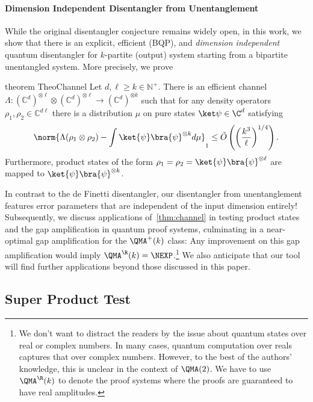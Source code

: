 \paragraph{Dimension Independent Disentangler from Unentanglement}
While the original disentangler conjecture remains widely open, in this work,
we show that there is an explicit, efficient (BQP), and \emph{dimension independent}
quantum disentangler for $k$-partite (output) system starting from a bipartite
unentangled system. More precisely, we prove

\begin{restatable}{theorem}
{TheoChannel}\label{thm:channel}
  Let $d,\ell \ge k \in \mathbb{N}^+$.
  There is an efficient channel $\Lambda \colon (\mathbb{C}^{d})^{\otimes \ell}\otimes (\mathbb{C}^{d})^{\otimes \ell} \to (\mathbb{C}^d)^{\otimes k}$
  such that for any density operators $\rho_1, \rho_2 \in \mathbb{C}^{d\ell}$ there is a distribution $\mu$ on pure states $\ket\psi \in \C^d$ satisfying
  \begin{align*}
    \norm{\Lambda(\rho_1 \otimes \rho_2) - \int \ket{\psi}\bra{\psi}^{\otimes k} d\mu}_1 \le \tilde O\left(\left(\frac{k^3}{\ell}\right)^{1/4}\right).
  \end{align*}
  Furthermore, product states of the form $\rho_1 = \rho_2 = \ket{\psi}\bra{\psi}^{\otimes \ell}$ are
  mapped to $\ket{\psi}\bra{\psi}^{\otimes k}$.
\end{restatable}

In contrast to the de Finetti disentangler, our disentangler from unentanglement features
error parameters that are independent of the input dimension entirely! 
%
Subsequently, we discuss applications of~\cref{thm:channel} in testing product states and
the gap amplification in quantum proof systems, culminating in a near-optimal gap amplification for the $\QMA^+(k)$ class: Any improvement on this gap amplification would imply $\QMA^\R(k)=\NEXP$.\footnote{
We don't want to distract the readers by the issue about quantum states over real or complex numbers.
In many cases, quantum computation over reals captures that over complex numbers. However, to the best of the authors' knowledge, this is unclear in the context of $\QMA(2)$. We have to use $\QMA^\R(k)$ to denote the proof systems where the proofs are guaranteed to have real amplitudes.}
%
We also anticipate that our tool will find further applications beyond those discussed in
this paper.

\subsection{Super Product Test}

